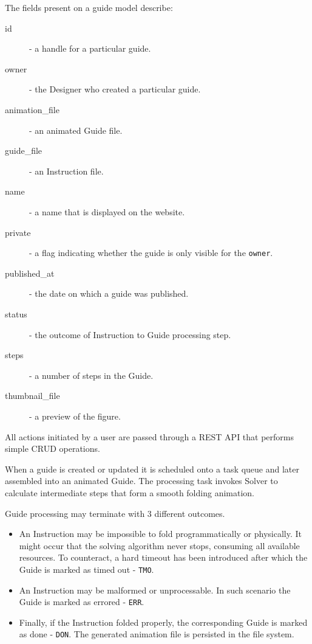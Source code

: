 The fields present on a guide model describe:
\begin{description}
	\item[id] - a handle for a particular guide.
	\item[owner] - the Designer who created a particular guide.
	\item[animation\_file] - an animated Guide file.
	\item[guide\_file] - an Instruction file.
	\item[name] - a name that is displayed on the website.
	\item[private] - a flag indicating whether the guide is only visible for the \texttt{owner}.
	\item[published\_at] - the date on which a guide was published.
	\item[status] - the outcome of Instruction to Guide processing step.
	\item[steps] - a number of steps in the Guide.
	\item[thumbnail\_file] - a preview of the figure.
\end{description}

All actions initiated by a user are passed through a REST API that performs simple CRUD operations.

\bigskip

When a guide is created or updated it is scheduled onto a task queue and later assembled into an animated Guide. The processing task invokes Solver to calculate intermediate steps that form a smooth folding animation. 

\medskip 
Guide processing may terminate with 3 different outcomes.

\begin{itemize}
	\item An Instruction may be impossible to fold programmatically or physically. It might occur that the solving algorithm never stops, consuming all available resources. To counteract, a hard timeout has been introduced after which the Guide is marked as timed out - \texttt{TMO}.
	\item An Instruction may be malformed or unprocessable. In such scenario the Guide is marked as errored - \texttt{ERR}.
	\item Finally, if the Instruction folded properly, the corresponding Guide is marked as done - \texttt{DON}. The generated animation file is persisted in the file system.
\end{itemize}


